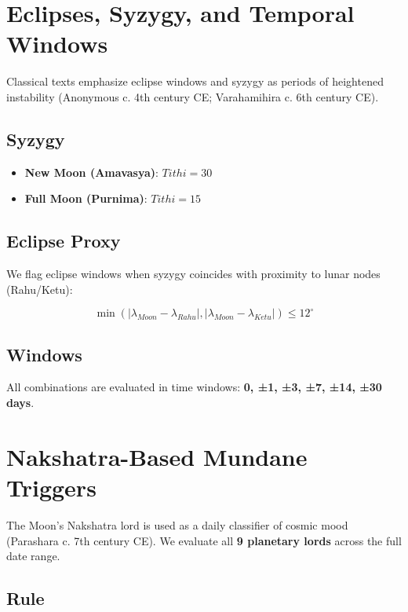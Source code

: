 \documentclass[
  11pt,
  a4paper,
  oneside,
  openany]{article}
\providecommand{\tightlist}{%
  \setlength{\itemsep}{0pt}\setlength{\parskip}{0pt}}\usepackage{longtable,booktabs,array}
\begin{document}
\section{Eclipses, Syzygy, and Temporal
Windows}\label{eclipses-syzygy-and-temporal-windows}

Classical texts emphasize eclipse windows and syzygy as periods of
heightened instability (Anonymous c. 4th century CE; Varahamihira c. 6th
century CE).

\subsection{Syzygy}\label{syzygy}

\begin{itemize}
\tightlist
\item
  \textbf{New Moon (Amavasya)}: \(Tithi = 30\)
\item
  \textbf{Full Moon (Purnima)}: \(Tithi = 15\)
\end{itemize}

\subsection{Eclipse Proxy}\label{eclipse-proxy}

We flag eclipse windows when syzygy coincides with proximity to lunar
nodes (Rahu/Ketu):

\[
\min(|\lambda_{Moon}-\lambda_{Rahu}|, |\lambda_{Moon}-\lambda_{Ketu}|) \leq 12^\circ
\]

\subsection{Windows}\label{windows}

All combinations are evaluated in time windows: \textbf{0, ±1, ±3, ±7,
±14, ±30 days}.

\section{Nakshatra-Based Mundane
Triggers}\label{nakshatra-based-mundane-triggers}

The Moon's Nakshatra lord is used as a daily classifier of cosmic mood
(Parashara c. 7th century CE). We evaluate all \textbf{9 planetary
lords} across the full date range.

\subsection{Rule}\label{rule}
\end{document}
